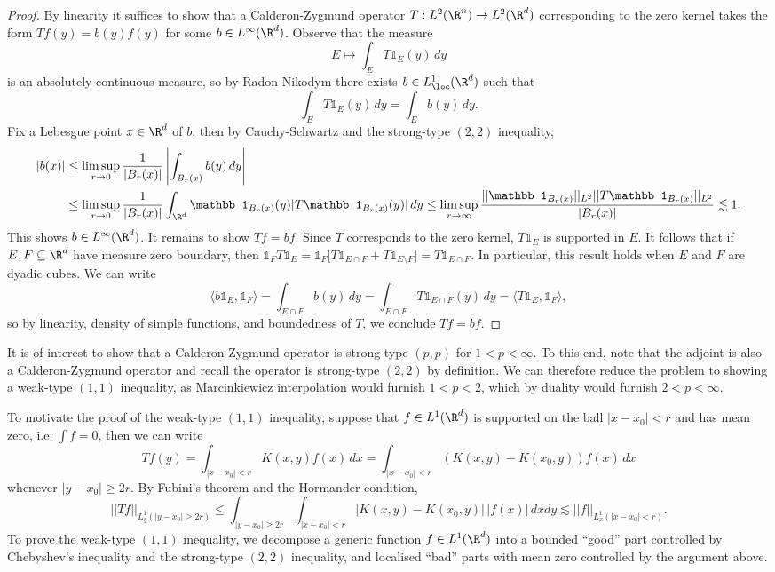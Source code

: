 \documentclass[reqno]{amsart}
\theoremstyle{definition}
\theoremstyle{remark}
\newcounter{problem}[section]	\declaretheorem[style=thmrecbox,name=Problem, numberlike=problem]{statement}
\begin{document}
\begin{proof}
	By linearity it suffices to show that a Calderon-Zygmund operator $T: L^2 (\R^n) \to L^2 (\R^d)$ corresponding to the zero kernel takes the form $Tf(y) = b(y) f(y)$ for some $b \in L^\infty (\R^d)$. Observe that the measure 
		\[ E \mapsto \int_E T \mathbb 1_E (y) \, dy \]
	is an absolutely continuous measure, so by Radon-Nikodym	there exists $b \in L^1_{\loc} (\R^d)$ such that 
		\[\int_E T \mathbb 1_E (y) \, dy = \int_E b(y) \, dy. \]
	Fix a Lebesgue point $x \in \R^d$ of $b$, then by Cauchy-Schwartz and the strong-type $(2, 2)$ inequality, 
		\begin{align*}	
			 |b(x)| 
			 	&\leq \limsup_{r \to 0} \frac{1}{|B_r (x)|} \left|\int_{B_r (x)} b(y) \, dy\right|\\
			 	&\leq \limsup_{r \to 0} \frac{1}{|B_r (x)|} \int_{\R^d} \mathbb 1_{B_r (x)} (y) |T \mathbb 1_{B_r (x)} (y)| \, dy \leq \limsup_{r \to \infty} \frac{||\mathbb 1_{B_r (x)}||_{L^2} ||T \mathbb 1_{B_r (x)} ||_{L^2}}{|B_r (x)|} \lesssim 1. 
		\end{align*}	 	
	This shows $b \in L^\infty (\R^d)$. It remains to show $Tf = bf$. Since $T$ corresponds to the zero kernel, $T\mathbb 1_E$ is supported in $E$. It follows that if $E, F \subseteq \R^d$ have measure zero boundary, then $\mathbb 1_F T\mathbb 1_E = \mathbb 1_F \big[T\mathbb 1_{E \cap F}+ T\mathbb 1_{E \setminus F}\big] = T\mathbb 1_{E \cap F}$. In particular, this result holds when $E$ and $F$ are dyadic cubes. We can write
		\[ \langle b \mathbb 1_E, \mathbb 1_F \rangle = \int_{E \cap F} b(y) \, dy = \int_{E \cap F} T \mathbb 1_{E \cap F} (y) \, dy = \langle T\mathbb 1_E, \mathbb 1_F \rangle, \]
	so by linearity, density of simple functions, and boundedness of $T$, we conclude $Tf = bf$. 
\end{proof}

It is of interest to show that a Calderon-Zygmund operator is strong-type $(p, p)$ for $1 < p < \infty$. To this end, note that the adjoint is also a Calderon-Zygmund operator and recall the operator is strong-type $(2, 2)$ by definition. We can therefore reduce the problem to showing a weak-type $(1, 1)$ inequality, as Marcinkiewicz interpolation would furnish $1 < p < 2$, which by duality would furnish $2 < p < \infty$. 

	To motivate the proof of the weak-type $(1, 1)$ inequality, suppose that $f \in L^1 (\R^d)$ is supported on the ball $|x - x_0| < r$ and has mean zero, i.e. $\int f = 0$, then we can write
	\[ Tf(y) = \int_{|x - x_0| < r} K(x, y) f(x) \, dx = \int_{|x - x_0| < r} (K(x, y) - K(x_0, y)) f(x) \, dx  \]
whenever $|y - x_0| \geq 2r$. 	
By Fubini's theorem and the Hormander condition, 
	\[ || T f||_{L^1_y (|y - x_0| \geq 2r)} \leq \int_{|y - x_0| \geq 2r} \int_{|x - x_0| < r} |K(x, y) - K(x_0, y)| \, |f(x)| \, dx dy \lesssim ||f||_{L^1_x (|x - x_0| < r)}. \]
	To prove the weak-type $(1, 1)$ inequality, we decompose a generic function $f \in L^1 (\R^d)$ into a bounded ``good'' part controlled by Chebyshev's inequality and the strong-type $(2, 2)$ inequality, and localised ``bad'' parts with mean zero controlled by the argument above. 
\end{document}
